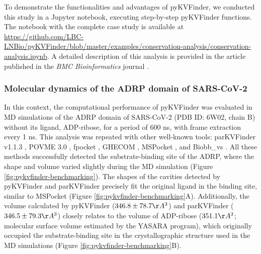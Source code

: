 \documentclass[Ingles]{phdthesis}
\begin{document}
To demonstrate the functionalities and advantages of pyKVFinder, we conducted this study in a Jupyter notebook, executing step-by-step pyKVFinder functions. The notebook with the complete case study is available at \url{https://github.com/LBC-LNBio/pyKVFinder/blob/master/examples/conservation-analysis/conservation-analysis.ipynb}. A detailed description of this analysis is provided in the article published in the \textit{BMC Bioinformatics} journal \cite{guerra2021}.

\subsubsection{Molecular dynamics of the ADRP domain of SARS-CoV-2}

In this context, the computational performance of pyKVFinder was evaluated in \acs{MD} simulations of the ADRP domain of SARS-CoV-2 (PDB ID: 6W02, chain B) without its ligand, ADP-ribose, for a period of 600 ns, with frame extraction every 1 ns. This analysis was repeated with other well-known tools: parKVFinder v1.1.3 \cite{guerra2020}, POVME 3.0 \cite{povme}, fpocket \cite{fpocket}, GHECOM \cite{ghecom}, MSPocket \cite{mspocket}, and Biobb_vs \cite{biobbvs}. All these methods successfully detected the substrate-binding site of the ADRP, where the shape and volume varied slightly during the MD simulation (Figure \ref{fig:pykvfinder-benchmarking}). The shapes of the cavities detected by pyKVFinder and parKVFinder precisely fit the original ligand in the binding site, similar to MSPocket (Figure \ref{fig:pykvfinder-benchmarking}A). Additionally, the volume calculated by pyKVFinder ($346.8 \pm 78.7 \AA^3$) and parKVFinder ($346.5 \pm 79.3 \AA^3$) closely relates to the volume of ADP-ribose ($351.1 \AA^3$; molecular surface volume estimated by the YASARA program), which originally occupied the substrate-binding site in the crystallographic structure used in the MD simulations (Figure \ref{fig:pykvfinder-benchmarking}B).
\end{document}
